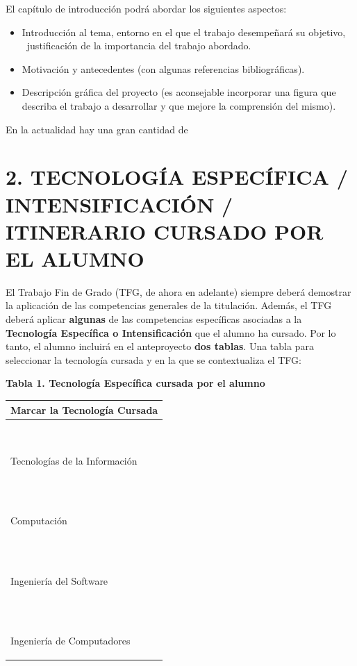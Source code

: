 \documentclass[a4paper]{article}
\newcommand\liststyleWWNumxxix{%
\renewcommand\labelitemi{{}-}
\renewcommand\labelitemii{o}
\renewcommand\labelitemiii{[F0A7?]}
\renewcommand\labelitemiv{[F0B7?]}
}
\begin{document}
El cap\'itulo de introducci\'on podr\'a abordar los siguientes aspectos:

\liststyleWWNumxxix
\begin{itemize}
\item Introducci\'on al tema, entorno en el que el trabajo desempe\~nar\'a su objetivo, \ justificaci\'on de la
importancia del trabajo abordado.
\item Motivaci\'on y antecedentes (con algunas referencias bibliogr\'aficas).
\item Descripci\'on gr\'afica del proyecto (es aconsejable incorporar una figura que describa el trabajo a desarrollar y
que mejore la comprensi\'on del mismo).
\end{itemize}

En la actualidad hay una gran cantidad de 


\section{2. TECNOLOG\'IA ESPEC\'IFICA / INTENSIFICACIÓN / ITINERARIO CURSADO POR EL ALUMNO}
El Trabajo Fin de Grado (TFG, de ahora en adelante) siempre deber\'a demostrar la aplicaci\'on de las competencias
generales de la titulaci\'on. Adem\'as, el TFG deber\'a aplicar \textbf{algunas} de las competencias espec\'ificas
asociadas a la \textbf{Tecnolog\'ia Espec\'ifica o Intensificaci\'on} que el alumno ha cursado. Por lo tanto, el alumno
incluir\'a en el anteproyecto \textbf{dos tablas}. Una tabla para seleccionar la tecnolog\'ia cursada y en la que se
contextualiza el TFG:


\bigskip

{\centering\bfseries
Tabla 1. Tecnolog\'ia Espec\'ifica cursada por el alumno
\par}

\begin{center}
\tablefirsthead{}
\tablehead{}
\tabletail{}
\tablelasttail{}
\begin{supertabular}{m{6.803cm}}
{\bfseries Marcar la Tecnolog\'ia Cursada}
\\\hline
~

Tecnolog\'ias de la Informaci\'on\\
~

Computaci\'on\\
~

Ingenier\'ia del Software\\
~

Ingenier\'ia de Computadores\\\hline
\end{supertabular}
\end{center}
\end{document}
